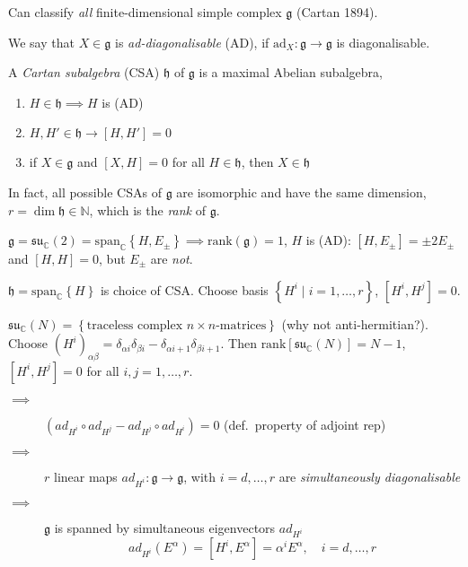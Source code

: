 Can classify \emph{all} finite-dimensional simple complex $\mathfrak{g}$ (Cartan 1894).
\begin{definition}[]
  We say that $X \in \mathfrak{g}$ is \emph{ad-diagonalisable} (AD), if $\text{ad}_X \colon \mathfrak{g} \to \mathfrak{g}$ is diagonalisable.
\end{definition}
\begin{definition}[]
  A \emph{Cartan subalgebra} (CSA) $\mathfrak{h}$ of $\mathfrak{g}$ is a maximal Abelian subalgebra,
  \begin{enumerate}
    \item $H \in \mathfrak{h} \implies H$ is (AD)
    \item $H, H' \in \mathfrak{h} \to  [H, H'] = 0$
    \item if $X \in \mathfrak{g}$ and $[X, H] = 0$ for all $H \in \mathfrak{h}$, then $X \in \mathfrak{h}$
  \end{enumerate}
\end{definition}
In fact, all possible CSAs of $\mathfrak{g}$ are isomorphic and have the same dimension, $r = \dim \mathfrak{h} \in \mathbb{N}$, which is the \emph{rank} of $\mathfrak{g}$.
\begin{example}[]
  $\mathfrak{g} = \mathfrak{su}_{\mathbb{C}}(2) = \text{span}_{\mathbb{C}} \left\{ H, E_{\pm} \right\} \implies \text{rank}(\mathfrak{g}) = 1$, $H$ is (AD): $[H, E_{\pm}] = \pm 2 E_{\pm}$ and $[H, H] = 0$, but $E_\pm$ are \emph{not}.
\end{example}
$\mathfrak{h} = \text{span}_{\mathbb{C}} \left\{ H \right\}$ is choice of CSA. Choose basis $\left\{ H^{i} \mid i = 1, \dots, r \right\}$, $[H^{i}, H^{j}] = 0$.
\begin{example}[]
  $\mathfrak{su}_{\mathbb{C}}(N) = \left\{ \text{traceless complex $n \times n$-matrices} \right\}$ (why not anti-hermitian?).
  Choose $(H^{i})_{\alpha\beta} = \delta_{\alpha i} \delta_{\beta i} - \delta_{\alpha i + 1} \delta_{\beta i + 1}$.
  Then $\text{rank} [\mathfrak{su}_{\mathbb{C}}(N)] = N-1$, $[H^{i}, H^{j}] = 0$ for all $i,j = 1, \dots, r$.
  \begin{description}
    \item[$\implies$] $(ad_{H^{i}} \circ ad_{H^{j}} - ad_{H^{j}} \circ ad_{H^{i}}) = 0$ (def.~property of adjoint rep)
    \item[$\implies$] $r$ linear maps $ad_{H^{i}}\colon \mathfrak{g} \to \mathfrak{g}$, with $i = d, \dots, r$ are \emph{simultaneously diagonalisable}
    \item[$\implies$] $\mathfrak{g}$ is spanned by simultaneous eigenvectors $ad_{H^{i}}$
      \begin{equation}
	\boxed{ad_{H^{i}} (E^{\alpha}) = [H^{i}, E^{\alpha}] = \alpha^{i} E^{\alpha}, \quad i = d, \dots, r}
      \end{equation}
  \end{description}
\end{example}

